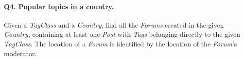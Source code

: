 \paragraph{\textbf{Q4}. Popular topics in a country.}
Given a \emph{TagClass} and a \emph{Country}, find all the \emph{Forums}
created in the given \emph{Country}, containing at least one \emph{Post}
with \emph{Tags} belonging directly to the given \emph{TagClass}.
The location of a \emph{Forum} is identified by the location of the
\emph{Forum}'s moderator.

